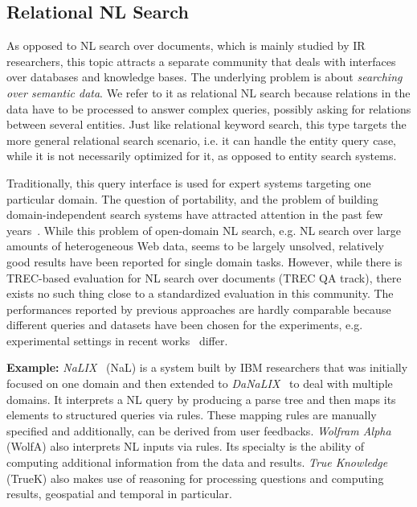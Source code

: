 \subsection{Relational NL Search} As opposed to NL search over documents, which is mainly studied by IR researchers, this topic attracts a separate community that deals with interfaces over databases and knowledge bases. The underlying problem is about \emph{searching over semantic data}. We refer to it as relational NL search because relations in the data have to be processed to answer complex queries, possibly asking for relations between several entities. Just like relational keyword search, this type targets the more general relational search scenario, i.e. it can handle the entity query case, while it is not necessarily optimized for it, as opposed to entity search systems.  

Traditionally, this query interface is used for expert systems targeting one particular domain.  The question of portability, and the problem of building domain-independent search systems have attracted attention in the past few years~\cite{DBLP:conf/esws/WangXZY07,DBLP:journals/dke/CimianoHHMS08,DBLP:conf/aaai/LiCYSJ07}. While this problem of open-domain NL search, e.g. NL search over large amounts of heterogeneous Web data, seems to be largely unsolved, relatively good results have been reported for single domain tasks. However, while there is TREC-based evaluation for NL search over documents (TREC QA track), there exists no such thing close to a standardized evaluation in this community. The performances reported by previous approaches are hardly comparable because different queries and datasets have been chosen for the experiments, e.g. experimental settings in recent works~\cite{DBLP:conf/esws/DamljanovicAC10,DBLP:conf/iui/HanNPPL10,DBLP:journals/tods/LiYJ07} differ. 

\textbf{Example:} \emph{NaLIX}~\cite{DBLP:journals/tods/LiYJ07} (NaL) is a system built by IBM researchers that was initially focused on one domain and then extended to \emph{DaNaLIX}~\cite{DBLP:conf/aaai/LiCYSJ07} to deal with multiple domains. It interprets a NL query by producing a parse tree and then maps its elements to structured queries via rules. These mapping rules are manually specified and additionally, can be derived from user feedbacks. \emph{Wolfram Alpha} (WolfA) also interprets NL inputs via rules. Its specialty is the ability of computing additional information from the data and results. \emph{True Knowledge} (TrueK) also makes use of reasoning for processing questions and computing results, geospatial and temporal in particular. 



